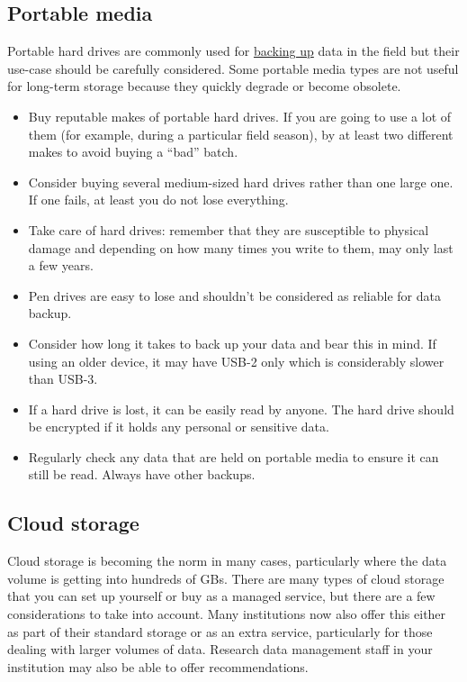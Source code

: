 \documentclass[12pt,a4paper,oneside]{report}
\providecommand{\tightlist}{%
  \setlength{\itemsep}{0pt}\setlength{\parskip}{0pt}}
\begin{document}
\hypertarget{portable-media}{%
\subsection{Portable media}\label{portable-media}}

Portable hard drives are commonly used for
\protect\hyperlink{data-backup}{backing up} data in the field but their
use-case should be carefully considered. Some portable media types are
not useful for long-term storage because they quickly degrade or become
obsolete.

\begin{itemize}
\tightlist
\item
  Buy reputable makes of portable hard drives. If you are going to use a
  lot of them (for example, during a particular field season), by at
  least two different makes to avoid buying a ``bad'' batch.
\item
  Consider buying several medium-sized hard drives rather than one large
  one. If one fails, at least you do not lose everything.
\item
  Take care of hard drives: remember that they are susceptible to
  physical damage and depending on how many times you write to them, may
  only last a few years.
\item
  Pen drives are easy to lose and shouldn't be considered as reliable
  for data backup.
\item
  Consider how long it takes to back up your data and bear this in mind.
  If using an older device, it may have USB-2 only which is considerably
  slower than USB-3.
\item
  If a hard drive is lost, it can be easily read by anyone. The hard
  drive should be encrypted if it holds any personal or sensitive data.
\item
  Regularly check any data that are held on portable media to ensure it
  can still be read. Always have other backups.
\end{itemize}

\hypertarget{cloud-storage}{%
\subsection{Cloud storage}\label{cloud-storage}}

Cloud storage is becoming the norm in many cases, particularly where the
data volume is getting into hundreds of GBs. There are many types of
cloud storage that you can set up yourself or buy as a managed service,
but there are a few considerations to take into account. Many
institutions now also offer this either as part of their standard
storage or as an extra service, particularly for those dealing with
larger volumes of data. Research data management staff in your
institution may also be able to offer recommendations.
\end{document}
